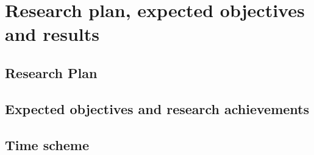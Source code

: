 \chapter{Research plan, expected objectives and results}\label{sec-RP}

\section{Research Plan} 
\section{Expected objectives and research achievements}
\section{ Time scheme}

\newpage
